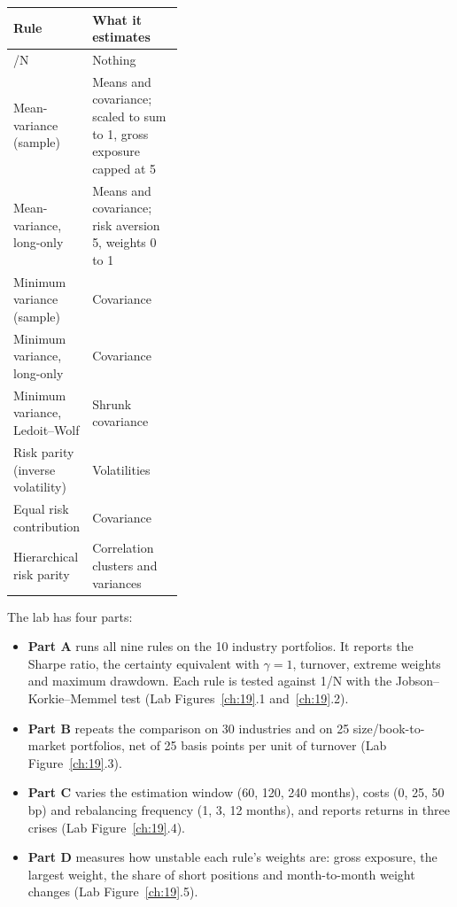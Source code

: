 \begin{center}
\small
\begin{tabularx}{0.9\linewidth}{@{}>{\raggedright\arraybackslash}p{0.38\linewidth}>{\raggedright\arraybackslash}X@{}}
\toprule
Rule & What it estimates \\
\midrule
1/N & Nothing \\
Mean-variance (sample) & Means and covariance; scaled to sum to 1, gross exposure capped at 5 \\
Mean-variance, long-only & Means and covariance; risk aversion 5, weights 0 to 1 \\
Minimum variance (sample) & Covariance \\
Minimum variance, long-only & Covariance \\
Minimum variance, Ledoit--Wolf & Shrunk covariance \\
Risk parity (inverse volatility) & Volatilities \\
Equal risk contribution & Covariance \\
Hierarchical risk parity & Correlation clusters and variances \\
\bottomrule
\end{tabularx}
\end{center}

The lab has four parts:

\begin{itemize}
  \item \textbf{Part A} runs all nine rules on the 10 industry portfolios. It reports the Sharpe ratio, the certainty equivalent with $\gamma = 1$, turnover, extreme weights and maximum drawdown. Each rule is tested against 1/N with the Jobson--Korkie--Memmel test (Lab Figures~\ref{ch:19}.1 and~\ref{ch:19}.2).
  \item \textbf{Part B} repeats the comparison on 30 industries and on 25 size/book-to-market portfolios, net of 25 basis points per unit of turnover (Lab Figure~\ref{ch:19}.3).
  \item \textbf{Part C} varies the estimation window (60, 120, 240 months), costs (0, 25, 50 bp) and rebalancing frequency (1, 3, 12 months), and reports returns in three crises (Lab Figure~\ref{ch:19}.4).
  \item \textbf{Part D} measures how unstable each rule's weights are: gross exposure, the largest weight, the share of short positions and month-to-month weight changes (Lab Figure~\ref{ch:19}.5).
\end{itemize}

